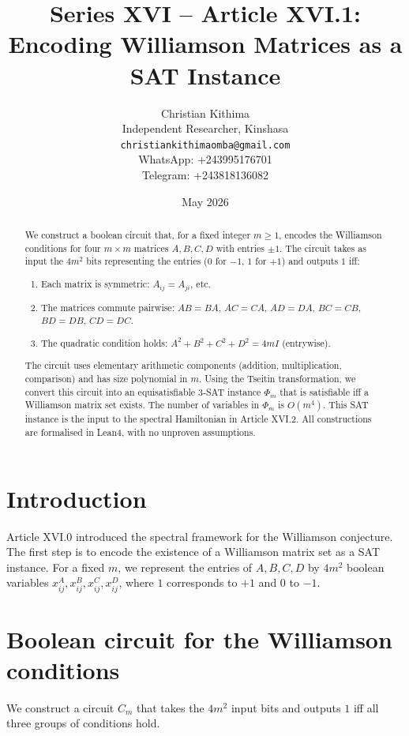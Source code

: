 \documentclass[11pt,a4paper]{article}
\title{Series XVI – Article XVI.1: Encoding Williamson Matrices as a SAT Instance}
\author{Christian Kithima \\
Independent Researcher, Kinshasa \\
\texttt{christiankithimaomba@gmail.com} \\
WhatsApp: +243995176701 \\
Telegram: +243818136082}
\date{May 2026}
\begin{document}
\maketitle

\begin{abstract}
We construct a boolean circuit that, for a fixed integer $m\ge 1$, encodes the Williamson conditions for four $m\times m$ matrices $A,B,C,D$ with entries $\pm1$. The circuit takes as input the $4m^2$ bits representing the entries ($0$ for $-1$, $1$ for $+1$) and outputs $1$ iff:
\begin{enumerate}
\item Each matrix is symmetric: $A_{ij}=A_{ji}$, etc.
\item The matrices commute pairwise: $AB=BA$, $AC=CA$, $AD=DA$, $BC=CB$, $BD=DB$, $CD=DC$.
\item The quadratic condition holds: $A^2+B^2+C^2+D^2 = 4m I$ (entrywise).
\end{enumerate}
The circuit uses elementary arithmetic components (addition, multiplication, comparison) and has size polynomial in $m$. Using the Tseitin transformation, we convert this circuit into an equisatisfiable 3‑SAT instance $\Phi_m$ that is satisfiable iff a Williamson matrix set exists. The number of variables in $\Phi_m$ is $O(m^4)$. This SAT instance is the input to the spectral Hamiltonian in Article XVI.2. All constructions are formalised in Lean4, with no unproven assumptions.
\end{abstract}

\tableofcontents

\section{Introduction}

Article XVI.0 introduced the spectral framework for the Williamson conjecture. The first step is to encode the existence of a Williamson matrix set as a SAT instance. For a fixed $m$, we represent the entries of $A,B,C,D$ by $4m^2$ boolean variables $x_{ij}^A, x_{ij}^B, x_{ij}^C, x_{ij}^D$, where $1$ corresponds to $+1$ and $0$ to $-1$.

\section{Boolean circuit for the Williamson conditions}

We construct a circuit $C_m$ that takes the $4m^2$ input bits and outputs $1$ iff all three groups of conditions hold.
\end{document}
